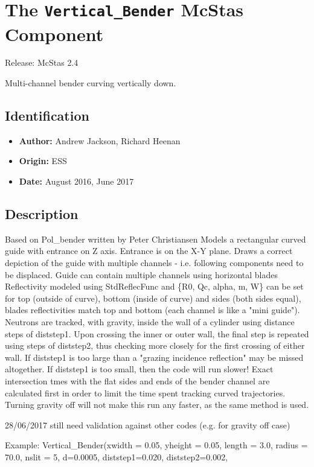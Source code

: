 \section{The \texttt{Vertical\_Bender} McStas Component}
Release: McStas 2.4

Multi-channel bender curving vertically down.

\subsection*{Identification}
\begin{itemize}
  \item \textbf{Author:} Andrew Jackson, Richard Heenan
  \item \textbf{Origin:} ESS
  \item \textbf{Date:} August 2016, June 2017
\end{itemize}

\subsection*{Description}
Based on Pol\_bender written by Peter Christiansen Models a rectangular curved guide with entrance on Z axis. Entrance is on the X-Y plane. Draws a correct depiction of the guide with multiple channels - i.e. following components need to be displaced. Guide can contain multiple channels using horizontal blades Reflectivity modeled using StdReflecFunc and \{R0, Qc, alpha, m, W\} can be set for top (outside of curve), bottom (inside of curve) and sides (both sides equal), blades reflectivities match top and bottom (each channel is like a "mini guide"). Neutrons are tracked, with gravity, inside the wall of a cylinder using distance steps of diststep1. Upon crossing the inner or outer wall, the final step is repeated using steps of diststep2, thus checking more closely for the first crossing of either wall. If diststep1 is too large than a "grazing incidence reflection" may be missed altogether. If diststep1 is too small, then the code will run slower! Exact intersection tmes with the flat sides and ends of the bender channel are calculated first in order to limit the time spent tracking curved trajectories. Turning gravity off will not make this run any faster, as the same method is used.

28/06/2017 still need validation against other codes (e.g. for gravity off case)

Example: Vertical\_Bender(xwidth = 0.05, yheight = 0.05, length = 3.0, radius = 70.0, nslit = 5, d=0.0005, diststep1=0.020, diststep2=0.002,

